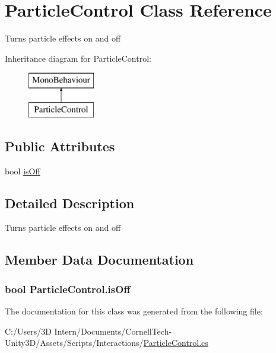 \hypertarget{class_particle_control}{}\section{Particle\+Control Class Reference}
\label{class_particle_control}


Turns particle effects on and off  


Inheritance diagram for Particle\+Control\+:\begin{figure}[H]
\begin{center}
\leavevmode
\includegraphics[height=2.000000cm]{class_particle_control}
\end{center}
\end{figure}
\subsection*{Public Attributes}
\begin{DoxyCompactItemize}
\item 
bool \hyperlink{class_particle_control_a75e658e4919cb47c396664bed7752659}{is\+Off}
\end{DoxyCompactItemize}


\subsection{Detailed Description}
Turns particle effects on and off 



\subsection{Member Data Documentation}
\subsubsection[{\texorpdfstring{is\+Off}{isOff}}]{\setlength{\rightskip}{0pt plus 5cm}bool Particle\+Control.\+is\+Off}\hypertarget{class_particle_control_a75e658e4919cb47c396664bed7752659}{}\label{class_particle_control_a75e658e4919cb47c396664bed7752659}


The documentation for this class was generated from the following file\+:\begin{DoxyCompactItemize}
\item 
C\+:/\+Users/3\+D Intern/\+Documents/\+Cornell\+Tech-\/\+Unity3\+D/\+Assets/\+Scripts/\+Interactions/\hyperlink{_particle_control_8cs}{Particle\+Control.\+cs}\end{DoxyCompactItemize}
